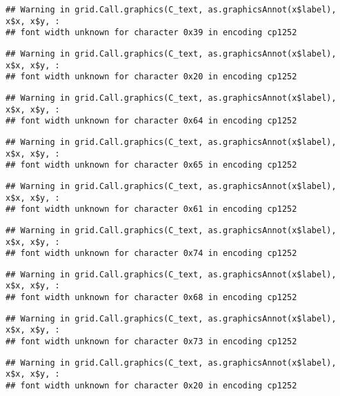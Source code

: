 \documentclass[
]{article}
\begin{document}
\begin{verbatim}
## Warning in grid.Call.graphics(C_text, as.graphicsAnnot(x$label), x$x, x$y, :
## font width unknown for character 0x39 in encoding cp1252
\end{verbatim}

\begin{verbatim}
## Warning in grid.Call.graphics(C_text, as.graphicsAnnot(x$label), x$x, x$y, :
## font width unknown for character 0x20 in encoding cp1252
\end{verbatim}

\begin{verbatim}
## Warning in grid.Call.graphics(C_text, as.graphicsAnnot(x$label), x$x, x$y, :
## font width unknown for character 0x64 in encoding cp1252
\end{verbatim}

\begin{verbatim}
## Warning in grid.Call.graphics(C_text, as.graphicsAnnot(x$label), x$x, x$y, :
## font width unknown for character 0x65 in encoding cp1252
\end{verbatim}

\begin{verbatim}
## Warning in grid.Call.graphics(C_text, as.graphicsAnnot(x$label), x$x, x$y, :
## font width unknown for character 0x61 in encoding cp1252
\end{verbatim}

\begin{verbatim}
## Warning in grid.Call.graphics(C_text, as.graphicsAnnot(x$label), x$x, x$y, :
## font width unknown for character 0x74 in encoding cp1252
\end{verbatim}

\begin{verbatim}
## Warning in grid.Call.graphics(C_text, as.graphicsAnnot(x$label), x$x, x$y, :
## font width unknown for character 0x68 in encoding cp1252
\end{verbatim}

\begin{verbatim}
## Warning in grid.Call.graphics(C_text, as.graphicsAnnot(x$label), x$x, x$y, :
## font width unknown for character 0x73 in encoding cp1252
\end{verbatim}

\begin{verbatim}
## Warning in grid.Call.graphics(C_text, as.graphicsAnnot(x$label), x$x, x$y, :
## font width unknown for character 0x20 in encoding cp1252
\end{verbatim}
\end{document}
